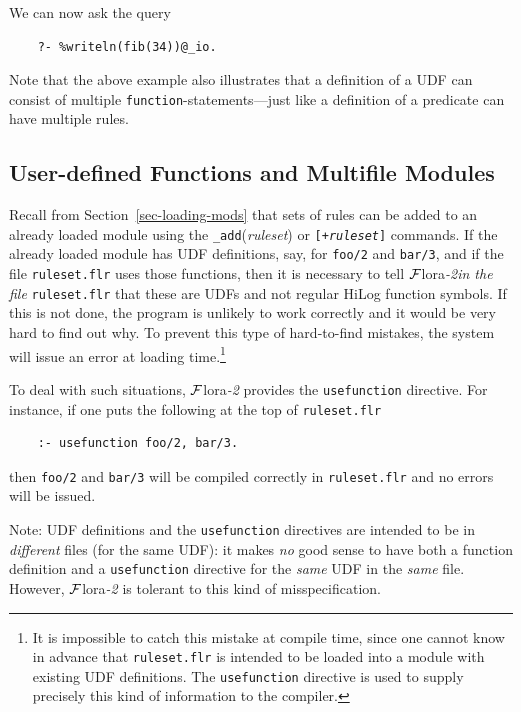 \documentclass[11pt]{article}
\newcommand{\FLORA}{{\mbox{\sc ${\cal F}${lora}\rm\emph{-2}}}\xspace}
\begin{document}
We can now ask the query
\begin{verbatim}
    ?- %writeln(fib(34))@_io.
\end{verbatim}
Note that the above example also illustrates that a definition of a UDF can
consist of multiple \texttt{function}-statements---just like a definition
of a predicate can have multiple rules. 

\subsection{User-defined Functions and Multifile Modules}

Recall from Section~\ref{sec-loading-mods} that sets of rules can be added to 
an already loaded module using the \texttt{\_add}(\emph{ruleset})
or \texttt{[+\textnormal{\emph{ruleset}}]}
commands.  
If the already loaded module has UDF definitions, say, for \texttt{foo/2}
and \texttt{bar/3}, and if 
the file \texttt{ruleset.flr} uses those functions, then it is necessary to
tell \FLORA \emph{in the file}   \texttt{ruleset.flr} that these are UDFs and not regular HiLog
function symbols. If this is not done, the program is unlikely to work
correctly and it would be very hard to find out why.
To prevent this type of hard-to-find mistakes, the system
will issue an error at loading time.\footnote{
  It is impossible to catch this mistake at compile time, since one
  cannot know in advance that \texttt{ruleset.flr} is intended to
  be loaded into a module with existing UDF definitions.
  The \texttt{usefunction} directive is used to supply precisely this kind
  of information to the compiler.
  }

To deal with such situations, \FLORA provides the \texttt{usefunction}
directive. For instance, if one puts the following at the top of
\texttt{ruleset.flr}
\begin{verbatim}
    :- usefunction foo/2, bar/3.
\end{verbatim}
then \texttt{foo/2} and \texttt{bar/3}
will be compiled correctly in \texttt{ruleset.flr} and
no errors will be issued. 

Note: UDF definitions and the \texttt{usefunction} directives are intended
to be in \emph{different} files (for the same UDF):
it makes \emph{no} good sense to have both a function definition and a
\texttt{usefunction} directive for the \emph{same} UDF in the \emph{same}
file. However, \FLORA is tolerant to this kind of misspecification.
\end{document}
